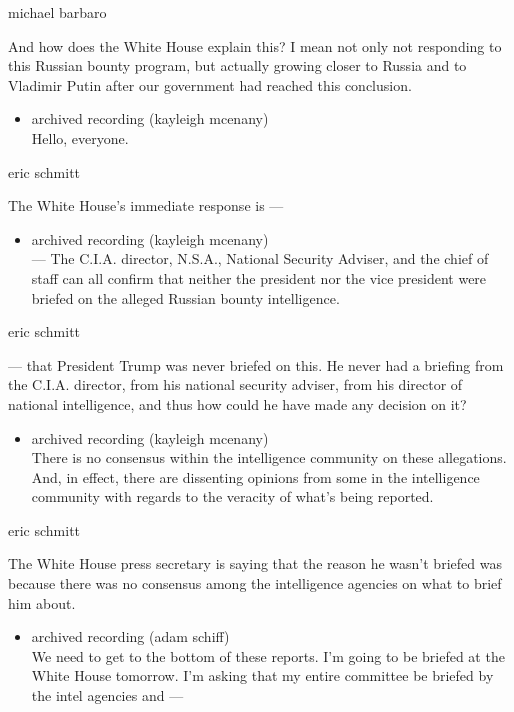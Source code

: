 michael barbaro

And how does the White House explain this? I mean not only not
responding to this Russian bounty program, but actually growing closer
to Russia and to Vladimir Putin after our government had reached this
conclusion.

\begin{itemize}
\tightlist
\item
  archived recording (kayleigh mcenany)\\
  Hello, everyone.
\end{itemize}

eric schmitt

The White House's immediate response is ---

\begin{itemize}
\tightlist
\item
  archived recording (kayleigh mcenany)\\
  --- The C.I.A. director, N.S.A., National Security Adviser, and the
  chief of staff can all confirm that neither the president nor the vice
  president were briefed on the alleged Russian bounty intelligence.
\end{itemize}

eric schmitt

--- that President Trump was never briefed on this. He never had a
briefing from the C.I.A. director, from his national security adviser,
from his director of national intelligence, and thus how could he have
made any decision on it?

\begin{itemize}
\tightlist
\item
  archived recording (kayleigh mcenany)\\
  There is no consensus within the intelligence community on these
  allegations. And, in effect, there are dissenting opinions from some
  in the intelligence community with regards to the veracity of what's
  being reported.
\end{itemize}

eric schmitt

The White House press secretary is saying that the reason he wasn't
briefed was because there was no consensus among the intelligence
agencies on what to brief him about.

\begin{itemize}
\tightlist
\item
  archived recording (adam schiff)\\
  We need to get to the bottom of these reports. I'm going to be briefed
  at the White House tomorrow. I'm asking that my entire committee be
  briefed by the intel agencies and ---
\end{itemize}


